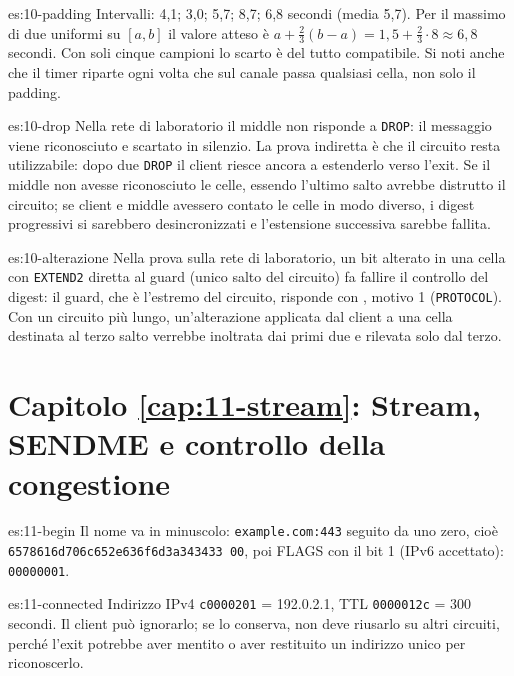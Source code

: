 \begin{soluzione}{es:10-padding}
Intervalli: 4,1; 3,0; 5,7; 8,7; 6,8 secondi (media 5,7). Per il massimo di due uniformi su $[a, b]$ il valore atteso è $a + \tfrac{2}{3}(b - a) = 1{,}5 + \tfrac{2}{3} \cdot 8 \approx 6{,}8$ secondi. Con soli cinque campioni lo scarto è del tutto compatibile. Si noti anche che il timer riparte ogni volta che sul canale passa qualsiasi cella, non solo il padding.
\end{soluzione}

\begin{soluzione}{es:10-drop}
Nella rete di laboratorio il middle non risponde a \texttt{DROP}: il messaggio viene riconosciuto e scartato in silenzio. La prova indiretta è che il circuito resta utilizzabile: dopo due \texttt{DROP} il client riesce ancora a estenderlo verso l'exit. Se il middle non avesse riconosciuto le celle, essendo l'ultimo salto avrebbe distrutto il circuito; se client e middle avessero contato le celle in modo diverso, i digest progressivi si sarebbero desincronizzati e l'estensione successiva sarebbe fallita.
\end{soluzione}

\begin{soluzione}{es:10-alterazione}
Nella prova sulla rete di laboratorio, un bit alterato in una cella con \texttt{EXTEND2} diretta al guard (unico salto del circuito) fa fallire il controllo del digest: il guard, che è l'estremo del circuito, risponde con , motivo 1 (\texttt{PROTOCOL}). Con un circuito più lungo, un'alterazione applicata dal client a una cella destinata al terzo salto verrebbe inoltrata dai primi due e rilevata solo dal terzo.
\end{soluzione}

\section*{Capitolo \ref{cap:11-stream}: Stream, SENDME e controllo della congestione}

\begin{soluzione}{es:11-begin}
Il nome va in minuscolo: \texttt{example.com:443} seguito da uno zero, cioè \texttt{6578616d706c652e636f6d3a343433 00}, poi FLAGS con il bit 1 (IPv6 accettato): \texttt{00000001}.
\end{soluzione}

\begin{soluzione}{es:11-connected}
Indirizzo IPv4 \texttt{c0000201} = 192.0.2.1, TTL \texttt{0000012c} = 300 secondi. Il client può ignorarlo; se lo conserva, non deve riusarlo su altri circuiti, perché l'exit potrebbe aver mentito o aver restituito un indirizzo unico per riconoscerlo.
\end{soluzione}

